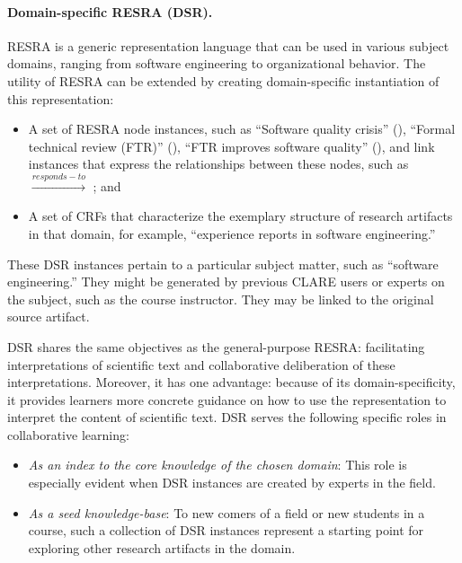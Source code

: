 \paragraph{Domain-specific RESRA (DSR).}

RESRA is a generic representation language that can be used in various
subject domains, ranging from software engineering to organizational
behavior. The utility of RESRA can be extended by creating domain-specific
instantiation of this representation:

\begin{itemize}
\item A set of RESRA node instances, such as ``Software quality crisis''
  (), ``Formal technical review (FTR)'' (), ``FTR improves software quality'' (), and link
  instances that express the relationships between these nodes, such as
   \(\stackrel{
  responds-to}{\longrightarrow}\) ; and
  
\item A set of CRFs that characterize the exemplary structure of research
  artifacts in that domain, for example, ``experience reports in software
  engineering.''
\end{itemize}

These DSR instances pertain to a particular subject matter, such as
``software engineering.'' They might be generated by previous CLARE users
or experts on the subject, such as the course instructor. They may be
linked to the original source artifact.

DSR shares the same objectives as the general-purpose RESRA: facilitating
interpretations of scientific text and collaborative deliberation of these
interpretations. Moreover, it has one advantage: because of its
domain-specificity, it provides learners more concrete guidance on how to
use the representation to interpret the content of scientific text. DSR
serves the following specific roles in collaborative learning:

\begin{itemize}
\item {\it As an {\it index\/} to the {\it core knowledge\/} of the chosen
  domain\/}: This role is especially evident when DSR instances are created
  by experts in the field.
    
\item {\it As a {\it seed knowledge-base\/}\/}: To new comers of a field or
  new students in a course, such a collection of DSR instances represent a
  starting point for exploring other research artifacts in the domain.
\end{itemize}

